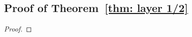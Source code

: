 \documentclass[twoside,11pt]{article}
\theoremstyle{remark}
\begin{document}
\subsection{Proof of Theorem~\ref{thm: layer 1/2}}
\begin{proof}






\end{proof}
\end{document}
